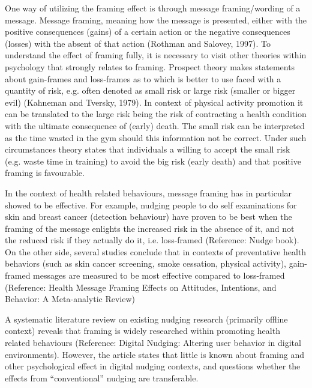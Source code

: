 One way of utilizing the framing effect is through message framing/wording of a message. Message framing, meaning how the message is presented, either with the positive consequences (gains) of a certain action or the negative consequences (losses) with the absent of that action \cite{rothman_shaping_1997} (Rothman and Salovey, 1997). To understand the effect of framing fully, it is necessary to visit other theories within psychology that strongly relates to framing. Prospect theory makes statements about gain-frames and loss-frames as to which is better to use faced with a quantity of risk, e.g. often denoted as small risk or large risk (smaller or bigger evil) (Kahneman and Tversky, 1979). In context of physical activity promotion it can be translated to the large risk being the risk of contracting a health condition with the ultimate consequence of (early) death. The small risk can be interpreted as the time wasted in the gym should this information not be correct. Under such circumstances theory states that individuals a willing to accept the small risk (e.g. waste time in training) to avoid the big risk (early death) and that positive framing is favourable. 

In the context of health related behaviours, message framing has in particular showed to be effective. For example, nudging people to do self examinations for skin and breast cancer (detection behaviour) have proven to be best when the framing of the message enlights the increased risk in the absence of it, and not the reduced risk if they actually do it, i.e. loss-framed (Reference: Nudge book). On the other side, several studies conclude that in contexts of preventative health behaviors (such as skin cancer screening, smoke cessation, physical activity), gain-framed messages are measured to be most effective compared to loss-framed \cite{gallagher_health_2012} (Reference: Health Message Framing Effects on Attitudes, Intentions, and Behavior: A Meta-analytic Review)

A systematic literature review on existing nudging research (primarily offline context) reveals that framing is widely researched within promoting health related behaviours (Reference: Digital Nudging: Altering user behavior in digital environments). However, the article states that little is known about framing and other psychological effect in digital nudging contexts, and questions whether the effects from “conventional” nudging are transferable. 

